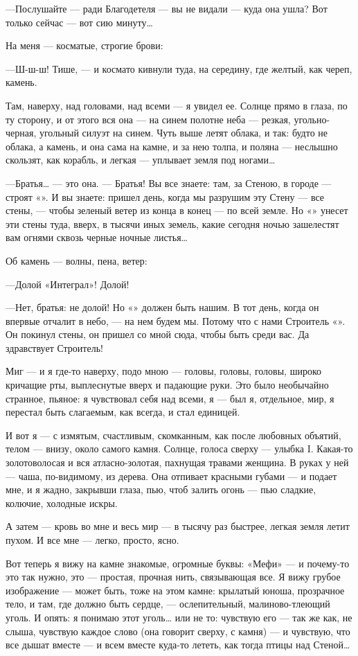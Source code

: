 \documentclass[11pt,openany]{book}
\begin{document}
---Послушайте --- ради Благодетеля --- вы не видали --- куда она ушла? Вот только сейчас --- вот сию минуту\ldots{}

На меня --- косматые, строгие брови:

---Ш-ш-ш! Тише, --- и космато кивнули туда, на середину, где желтый, как череп, камень.

Там, наверху, над головами, над всеми --- я увидел ее. Солнце прямо в глаза, по ту сторону, и от этого вся она --- на синем полотне неба --- резкая, угольно-черная, угольный силуэт на синем. Чуть выше летят облака, и так: будто не облака, а камень, и она сама на камне, и за нею толпа, и поляна --- неслышно скользят, как корабль, и легкая --- уплывает земля под ногами\ldots{}

---Братья\ldots{} --- это она. --- Братья! Вы все знаете: там, за Стеною, в городе --- строят «». И вы знаете: пришел день, когда мы разрушим эту Стену --- все стены, --- чтобы зеленый ветер из конца в конец --- по всей земле. Но «» унесет эти стены туда, вверх, в тысячи иных земель, какие сегодня ночью зашелестят вам огнями сквозь черные ночные листья\ldots{}

Об камень --- волны, пена, ветер:

---Долой «Интеграл»! Долой!

---Нет, братья: не долой! Но «» должен быть нашим. В тот день, когда он впервые отчалит в небо, --- на нем будем мы. Потому что с нами Строитель «». Он покинул стены, он пришел со мной сюда, чтобы быть среди вас. Да здравствует Строитель!

Миг --- и я где-то наверху, подо мною --- головы, головы, головы, широко кричащие рты, выплеснутые вверх и падающие руки. Это было необычайно странное, пьяное: я чувствовал себя над всеми, я --- был я, отдельное, мир, я перестал быть слагаемым, как всегда, и стал единицей.

И вот я --- с измятым, счастливым, скомканным, как после любовных объятий, телом --- внизу, около самого камня. Солнце, голоса сверху --- улыбка I. Какая-то золотоволосая и вся атласно-золотая, пахнущая травами женщина. В руках у ней --- чаша, по-видимому, из дерева. Она отпивает красными губами --- и подает мне, и я жадно, закрывши глаза, пью, чтоб залить огонь --- пью сладкие, колючие, холодные искры.

А затем --- кровь во мне и весь мир --- в тысячу раз быстрее, легкая земля летит пухом. И все мне --- легко, просто, ясно.

Вот теперь я вижу на камне знакомые, огромные буквы: «Мефи» --- и почему-то это так нужно, это --- простая, прочная нить, связывающая все. Я вижу грубое изображение --- может быть, тоже на этом камне: крылатый юноша, прозрачное тело, и там, где должно быть сердце, --- ослепительный, малиново-тлеющий уголь. И опять: я понимаю этот уголь\ldots{} или не то: чувствую его --- так же как, не слыша, чувствую каждое слово (она говорит сверху, с камня) --- и чувствую, что все дышат вместе --- и всем вместе куда-то лететь, как тогда птицы над Стеной\ldots{}
\end{document}
